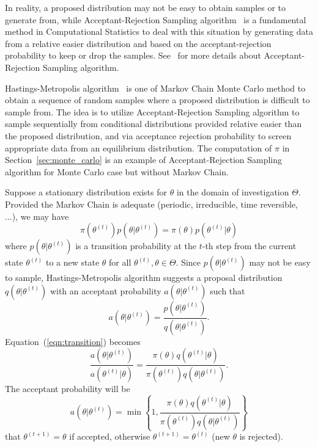 In reality, a proposed distribution may not be easy to obtain samples or
to generate from, while Acceptant-Rejection Sampling
algorithm~ is a fundamental
method in Computational Statistics to deal with this situation by generating
data from a relative easier distribution and based on the acceptant-rejection
probability to keep or drop the samples. See~\citet{Ross1996} for more details
about Acceptant-Rejection Sampling algorithm.

Hastings-Metropolis algorithm~\citep{Hastings1970,Metropolis1953}
is one of Markov Chain Monte Carlo method to obtain
a sequence of random samples where a proposed distribution is difficult to
sample from. The idea is to utilize Acceptant-Rejection Sampling algorithm
to sample sequentially from conditional distributions provided relative
easier than the proposed distribution, and via acceptance rejection
probability to screen appropriate data from an equilibrium distribution.
The computation of $\pi$ in Section~\ref{sec:monte_carlo}
is an example of Acceptant-Rejection Sampling algorithm for
Monte Carlo case but without Markov Chain.

Suppose a stationary distribution exists for $\theta$ in the domain of
investigation $\Theta$. Provided the Markov Chain is adequate
(periodic, irreducible, time reversible, ...), we may have
\begin{equation}
\pi(\theta^{(t)}) p(\theta | \theta^{(t)}) =
\pi(\theta) p(\theta^{(t)} | \theta)
\label{eqn:transition}
\end{equation}
where $p(\theta | \theta^{(t)})$ is a transition probability at the $t$-th step
from the current state $\theta^{(t)}$ to a new state $\theta$ for all
$\theta^{(t)}, \theta \in \Theta$.
Since $p(\theta | \theta^{(t)})$ may not be easy to sample, Hastings-Metropolis
algorithm suggests a proposal distribution $q(\theta | \theta^{(t)})$ with an
acceptant probability $a(\theta | \theta^{(t)})$ such that
\begin{equation}
a(\theta | \theta^{(t)}) =
\frac{p(\theta | \theta^{(t)})}{q(\theta | \theta^{(t)})}.
\label{eqn:accpetance}
\end{equation}
Equation~(\ref{eqn:transition}) becomes
\begin{equation}
\frac{a(\theta | \theta^{(t)})}{a(\theta^{(t)} | \theta)}
=
\frac{\pi(\theta) q(\theta^{(t)} | \theta)}{\pi(\theta^{(t)}) q(\theta | \theta^{(t)})}.
\label{eqn:acceptant_rejection}
\end{equation}
The acceptant probability will be
\begin{equation}
a(\theta | \theta^{(t)}) = \min \left\{
1,
\frac{\pi(\theta) q(\theta^{(t)} | \theta)}{
      \pi(\theta^{(t)}) q(\theta | \theta^{(t)})}
\right\}
\label{eqn:acceptant_probability}
\end{equation}
that
$\theta^{(t+1)} = \theta$ if accepted, otherwise
$\theta^{(t+1)} = \theta^{(t)}$ (new $\theta$ is rejected).

